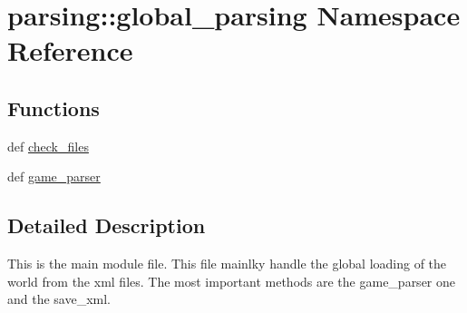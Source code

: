 \hypertarget{namespaceparsing_1_1global__parsing}{\section{parsing\-:\-:global\-\_\-parsing \-Namespace \-Reference}
\label{namespaceparsing_1_1global__parsing}
}
\subsection*{\-Functions}
\begin{DoxyCompactItemize}
\item 
def \hyperlink{namespaceparsing_1_1global__parsing_a94ef28b21f062230d79b4e2268f73f90}{check\-\_\-files}
\item 
def \hyperlink{namespaceparsing_1_1global__parsing_a608b877ce946394ce5e308fa76adc2e5}{game\-\_\-parser}
\end{DoxyCompactItemize}


\subsection{\-Detailed \-Description}
\begin{DoxyVerb}
This is the main module file.
This file mainlky handle the global loading of the world from the xml files.
The most important methods are the game_parser one and the save_xml.
\end{DoxyVerb}
 

